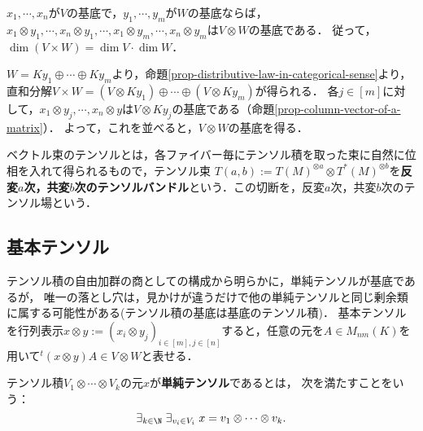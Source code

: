 \documentclass[uplatex, dvipdfmx]{jsreport}
\begin{document}
\begin{corollary}[テンソル空間の基底は基底のテンソル積]\label{cor-the-basis-of-tensor-product}
    $x_1,\cdots,x_n$が$V$の基底で，$y_1,\cdots,y_m$が$W$の基底ならば，$x_1\otimes y_1,\cdots,x_n\otimes y_1,\cdots,x_1\otimes y_m,\cdots,x_n\otimes y_m$は$V\otimes W$の基底である．
    従って，$\dim(V\times W)=\dim V\cdot\dim W$．
\end{corollary}
\begin{Proof}
    $W=Ky_1\oplus\cdots\oplus Ky_m$より，命題\ref{prop-distributive-law-in-categorical-sense}より，
    直和分解$V\times W=(V\otimes Ky_1)\oplus\cdots\oplus(V\otimes Ky_m)$が得られる．
    各$j\in[m]$に対して，$x_1\otimes y_j,\cdots,x_n\otimes y$は$V\otimes Ky_j$の基底である（命題\ref{prop-column-vector-of-a-matrix}）．
    よって，これを並べると，$V\otimes W$の基底を得る．
\end{Proof}

\begin{remarks}[ベクトル束のテンソル]
    ベクトル束のテンソルとは，各ファイバー毎にテンソル積を取った束に自然に位相を入れて得られるもので，テンソル束
    $T(a,b):=T(M)^{\otimes a}\otimes T^*(M)^{\otimes b}$を\textbf{反変$a$次，共変$b$次のテンソルバンドル}という．この切断を，反変$a$次，共変$b$次のテンソル場という．
\end{remarks}

\subsection{基本テンソル}

\begin{tcolorbox}[colframe=ForestGreen, colback=ForestGreen!10!white,breakable,colbacktitle=ForestGreen!40!white,coltitle=black,fonttitle=\bfseries\sffamily,
title=]
    テンソル積の自由加群の商としての構成から明らかに，単純テンソルが基底であるが，
    唯一の落とし穴は，見かけが違うだけで他の単純テンソルと同じ剰余類に属する可能性がある(テンソル積の基底は基底のテンソル積)．
    基本テンソルを行列表示$x\otimes y:=(x_i\otimes y_j)_{i\in[m],j\in[n]}$すると，任意の元を$A\in M_{nm}(K)$を用いて${}^t\!(x\otimes y)A\in V\otimes W$と表せる．
\end{tcolorbox}

\begin{definition}
    テンソル積$V_1\otimes\cdots\otimes V_k$の元$x$が\textbf{単純テンソル}であるとは，
    次を満たすことをいう：
    \[\exists_{k\in\N}\;\exists_{v_i\in V_i}\;x=v_1\otimes\cdots\otimes v_k.\]
\end{definition}
\end{document}
